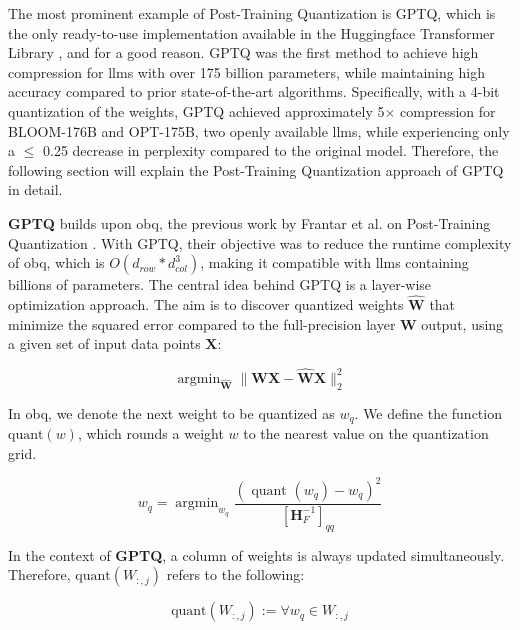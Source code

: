 The most prominent example of Post-Training Quantization is GPTQ, which is the only ready-to-use implementation available in the Huggingface Transformer Library \cite{noauthor_quantize_nodate}, and for a good reason. GPTQ was the first method to achieve high compression for \gls{llm}s with over 175 billion parameters, while maintaining high accuracy compared to prior state-of-the-art algorithms. Specifically, with a 4-bit quantization of the weights, GPTQ achieved approximately 5$\times$ compression for BLOOM-176B and OPT-175B, two openly available \gls{llm}s, while experiencing only a $\leq$ 0.25 decrease in perplexity compared to the original model. Therefore, the following section will explain the Post-Training Quantization approach of GPTQ in detail.

\textbf{GPTQ} builds upon \gls{obq}, the previous work by Frantar et al. on Post-Training Quantization \cite{frantar_optimal_2023}. With GPTQ, their objective was to reduce the runtime complexity of \gls{obq}, which is $O(d_{row} * d_{col}^{3})$, making it compatible with \gls{llm}s containing billions of parameters. The central idea behind GPTQ is a layer-wise optimization approach. The aim is to discover quantized weights $\widehat{\mathbf{W}}$ that minimize the squared error compared to the full-precision layer $\mathbf{W}$ output, using a given set of input data points $\mathbf{X}$:

\begin{equation}
    \operatorname{argmin}_{\widehat{\mathbf{W}}}\|\mathbf{W} \mathbf{X}-\widehat{\mathbf{W}} \mathbf{X}\|_2^2
\end{equation}

In \gls{obq}, we denote the next weight to be quantized as $w_q$. We define the function $\text{quant}(w)$, which rounds a weight $w$ to the nearest value on the quantization grid.

\begin{equation}
    w_q=\operatorname{argmin}_{w_q} \frac{\left(\text { quant }\left(w_q\right)-w_q\right)^2}{\left[\mathbf{H}_F^{-1}\right]_{q q}}
\end{equation}

In the context of \textbf{GPTQ}, a column of weights is always updated simultaneously. Therefore, $\text{quant}(W_{:,j})$ refers to the following:

\begin{equation}
    \text{quant}(W_{:,j}) := \operatorname \forall w_q \in W_{:,j} 
\end{equation}

